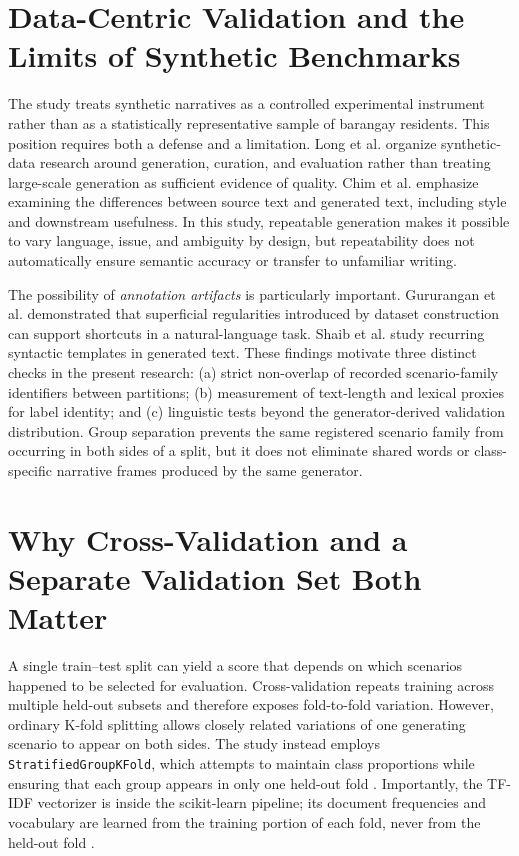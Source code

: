 \section{Data-Centric Validation and the Limits of Synthetic Benchmarks}
The study treats synthetic narratives as a controlled experimental instrument rather than as a statistically representative sample of barangay residents. This position requires both a defense and a limitation. Long et al. \cite{long} organize synthetic-data research around generation, curation, and evaluation rather than treating large-scale generation as sufficient evidence of quality. Chim et al. \cite{chim} emphasize examining the differences between source text and generated text, including style and downstream usefulness. In this study, repeatable generation makes it possible to vary language, issue, and ambiguity by design, but repeatability does not automatically ensure semantic accuracy or transfer to unfamiliar writing.

The possibility of \emph{annotation artifacts} is particularly important. Gururangan et al. \cite{gururangan} demonstrated that superficial regularities introduced by dataset construction can support shortcuts in a natural-language task. Shaib et al. \cite{shaib} study recurring syntactic templates in generated text. These findings motivate three distinct checks in the present research: (a) strict non-overlap of recorded scenario-family identifiers between partitions; (b) measurement of text-length and lexical proxies for label identity; and (c) linguistic tests beyond the generator-derived validation distribution. Group separation prevents the same registered scenario family from occurring in both sides of a split, but it does not eliminate shared words or class-specific narrative frames produced by the same generator.

\section{Why Cross-Validation and a Separate Validation Set Both Matter}
A single train--test split can yield a score that depends on which scenarios happened to be selected for evaluation. Cross-validation repeats training across multiple held-out subsets and therefore exposes fold-to-fold variation. However, ordinary K-fold splitting allows closely related variations of one generating scenario to appear on both sides. The study instead employs \texttt{StratifiedGroupKFold}, which attempts to maintain class proportions while ensuring that each group appears in only one held-out fold \cite{sklearngroup}. Importantly, the TF-IDF vectorizer is inside the scikit-learn pipeline; its document frequencies and vocabulary are learned from the training portion of each fold, never from the held-out fold \cite{sklearnpitfalls}.

